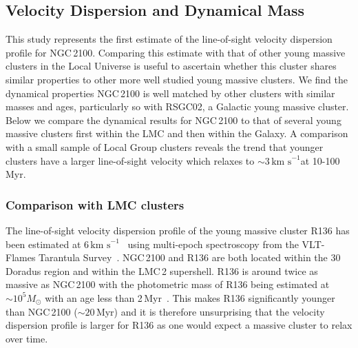 \documentclass[useAMS,usenatbib]{mn2e}
\def\kms{$\mbox{km s}^{-1}$}
\begin{document}
\subsection{Velocity Dispersion and Dynamical Mass} %
\label{sub:velocity_dispersion_Mdyn}


This study represents the first estimate of the line-of-sight velocity dispersion profile for NGC\,2100.
Comparing this estimate with that of other young massive clusters in the Local Universe is useful to ascertain whether this cluster shares similar properties to other more well studied young massive clusters.
We find the dynamical properties NGC\,2100 is well matched by other clusters with similar masses and ages, particularly so with RSGC02, a Galactic young massive cluster.
Below we compare the dynamical results for NGC\,2100 to that of several young massive clusters first within the LMC and then within the Galaxy.
A comparison with a small sample of Local Group clusters reveals the trend that younger clusters have a larger line-of-sight velocity which relaxes to $\sim$3\,\kms at 10-100\,Myr.

\subsubsection{Comparison with LMC clusters} %
\label{sub:comparison_with_lmc_clusters}


The line-of-sight velocity dispersion profile of the young massive cluster R136 has been estimated at 6\,\kms~\citep{2012A&A...546A..73H} using multi-epoch spectroscopy from the VLT-Flames Tarantula Survey~\citep{2011A&A...530A.108E}.
NGC\,2100 and R136 are both located within the 30 Doradus region and within the LMC\,2 supershell.
R136 is around twice as massive as NGC\,2100 with the photometric mass of R136 being estimated at $\sim10^{5}M_{\odot}$ with an age less than 2\,Myr~\citep{1998ApJ...509..879D,1998ApJ...493..180M,2010MNRAS.408..731C}.
This makes R136 significantly younger than NGC\,2100 ($\sim20$\,Myr) and it is therefore unsurprising that the velocity dispersion profile is larger for R136 as one would expect a massive cluster to relax over time.
\end{document}
